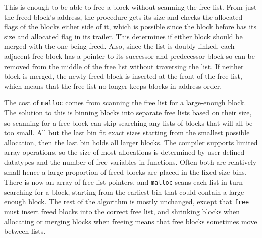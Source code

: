 
This is enough to be able to free a block without scanning the free list. From just the freed block's address, the procedure gets its size and checks the allocated flags of the blocks either side of it, which is possible since the block before has its size and allocated flag in its trailer. This determines if either block should be merged with the one being freed. Also, since the list is doubly linked, each adjacent free block has a pointer to its successor and predecessor block so can be removed from the middle of the free list without traversing the list. If neither block is merged, the newly freed block is inserted at the front of the free list, which means that the free list no longer keeps blocks in address order.

The cost of \verb|malloc| comes from scanning the free list for a large-enough block. The solution to this is binning blocks into separate free lists based on their size, so scanning for a free block can skip searching any lists of blocks that will all be too small. All but the last bin fit exact sizes starting from the smallest possible allocation, then the last bin holds all larger blocks. The compiler supports limited array operations, so the size of most allocations is determined by user-defined datatypes and the number of free variables in functions. Often both are relatively small hence a large proportion of freed blocks are placed in the fixed size bins.  
There is now an array of free list pointers, and \verb|malloc| scans each list in turn searching for a block, starting from the earliest bin that could contain a large-enough block. The rest of the algorithm is mostly unchanged, except that \verb|free| must insert freed blocks into the correct free list, and shrinking blocks when allocating or merging blocks when freeing means that free blocks sometimes move between lists.


